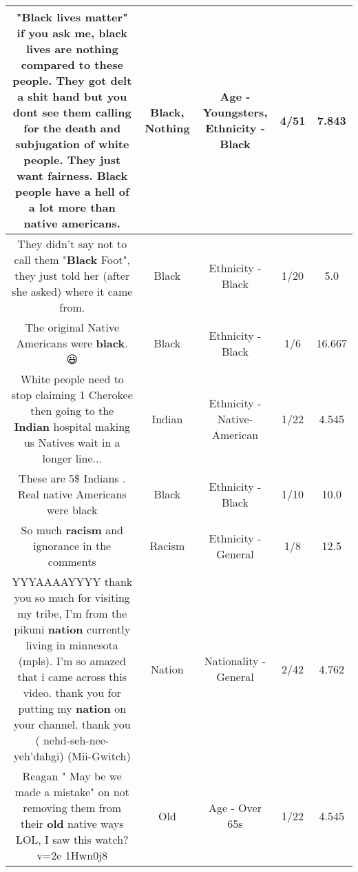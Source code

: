 \documentclass[11pt]{article}
\newlength\mylength
\begin{document}
\begin{center}
\begin{longtable}{|C{.65\mylength}|C{.30\mylength}|C{.12\mylength}|C{.12\mylength}|C{.12\mylength}|}
  \small "\textbf{Black} lives matter" if you ask me, \textbf{black} lives are \textbf{nothing} compared to these people. They got delt a shit hand but you dont see them calling for the death and subjugation of white people. They just want fairness. \textbf{Black} people have a hell of a lot more than native americans.\normalsize   & Black, Nothing & Age - Youngsters, Ethnicity - Black & 4/51 & 7.843 \\  \hline
  \small They didn't say not to call them "\textbf{Black} Foot", they just told her (after she asked) where it came from.\normalsize   & Black & Ethnicity - Black & 1/20 & 5.0 \\  \hline
  \small The original Native Americans were \textbf{black}.😃\normalsize   & Black & Ethnicity - Black & 1/6 & 16.667 \\  \hline
  \small White people need to stop claiming 1 Cherokee then going to the \textbf{Indian} hospital making us Natives wait in a longer line...\normalsize   & Indian & Ethnicity - Native-American & 1/22 & 4.545 \\  \hline
  \small These are 5\$ Indians . Real native Americans were black\normalsize   & Black & Ethnicity - Black & 1/10 & 10.0 \\  \hline
  \small So much \textbf{racism} and ignorance in the comments\normalsize   & Racism & Ethnicity - General & 1/8 & 12.5 \\  \hline
  \small YYYAAAAYYYY thank you so much for visiting my tribe, I'm from the pikuni \textbf{nation} currently living in minnesota (mpls). I'm so amazed that i came across this video. thank you for putting my \textbf{nation} on your channel. thank you ( nehd-seh-nee-yeh'dahgi) (Mii-Gwitch)\normalsize   & Nation & Nationality - General & 2/42 & 4.762 \\  \hline
  \small Reagan " May be we made a mistake" on not removing them from their \textbf{old} native ways LOL, I saw this watch?v=2e  1Hwn0j8\normalsize   & Old & Age - Over 65s & 1/22 & 4.545 \\  \hline

\end{longtable}
\end{center}
\end{document}
